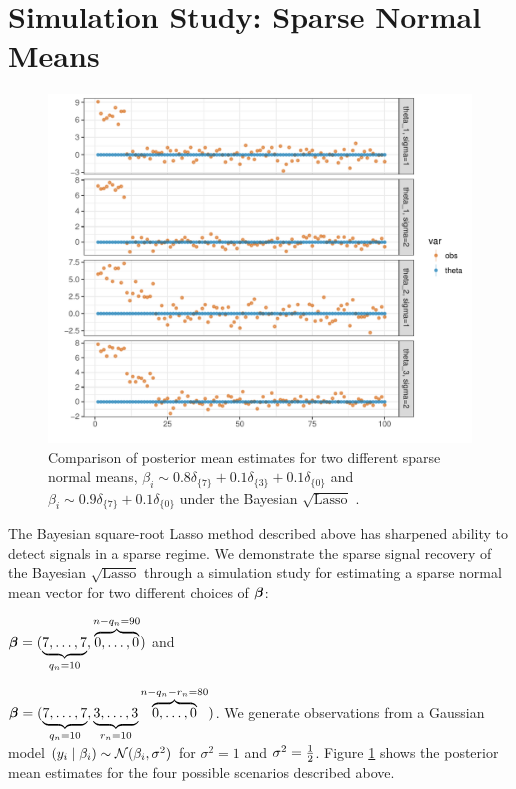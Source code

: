\documentclass[12pt]{article}
\begin{document}
\section{Simulation Study: Sparse Normal Means}
\begin{figure}[!ht]%
\centering
\includegraphics[width=\columnwidth]{art/sparse-means-sql-1}%
\caption{Comparison of posterior mean estimates for two different sparse normal means, $\beta_i \sim 0.8 \delta_{\{7\}}+0.1\delta_{\{3\}}+0.1\delta_{\{0\}}$ and $\beta_i \sim 0.9 \delta_{\{7\}}+0.1\delta_{\{0\}}$ under the Bayesian $\sqrt{\text{Lasso}}$ . }%
\label{fig:sql-sim-1}%
\end{figure}

The Bayesian square-root Lasso method described above has sharpened ability to detect signals in a sparse regime. We demonstrate the sparse signal recovery of the Bayesian $\sqrt{\text{Lasso}}$ through a simulation study for estimating a sparse normal mean vector for two different choices of $\boldsymbol{\beta}$: 
\ben
\item $\boldsymbol{\beta} = (\underbrace{7,\ldots,7}_{q_n=10},\overbrace{0,\ldots,0}^{n-q_n = 90})$ and 
\item $\boldsymbol{\beta} = (\underbrace{7,\ldots,7}_{q_{n}=10},\underbrace{3,\ldots,3}_{r_n=10}\overbrace{0,\ldots,0}^{n-q_n-r_n = 80})$.
\een
We generate observations from a Gaussian model $(y_i \mid \beta_i) \sim \mathcal{N}(\beta_i, \sigma^2)$ for $\sigma^2 = 1$ and $\sigma^2 = \frac{1}{2}$. Figure \ref{fig:sql-sim-1} shows the posterior mean estimates for the four possible scenarios described above. 

%



\end{document}
